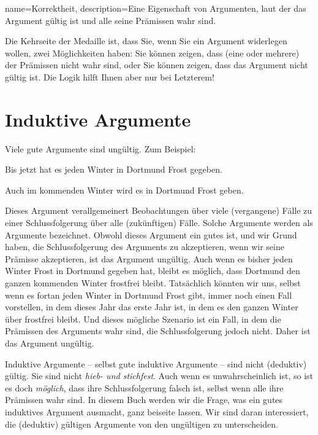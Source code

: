 {
name=Korrektheit,
description={Eine Eigenschaft von Argumenten, laut der das Argument gültig ist und alle seine Prämissen wahr sind.}
}

Die Kehrseite der Medaille ist, dass Sie, wenn Sie ein Argument widerlegen wollen, zwei Möglichkeiten haben: Sie können zeigen, dass (eine oder mehrere) der Prämissen nicht wahr sind, oder Sie können zeigen, dass das Argument nicht gültig ist. Die Logik hilft Ihnen aber nur bei Letzterem!  

\section{Induktive Argumente}

Viele gute Argumente sind ungültig. Zum Beispiel:
	\begin{earg}
		\item[] Bis jetzt hat es jeden Winter in Dortmund Frost gegeben.
	\item[\therefore] Auch im kommenden Winter wird es in Dortmund Frost geben.
\end{earg}
Dieses Argument verallgemeinert Beobachtungen über viele (vergangene) Fälle zu einer Schlussfolgerung über alle (zukünftigen) Fälle. Solche Argumente werden als  Argumente bezeichnet. Obwohl dieses Argument ein gutes ist, und wir Grund haben, die Schlussfolgerung des Arguments zu akzeptieren, wenn wir seine Prämisse akzeptieren, ist das Argument ungültig. Auch wenn es bisher jeden Winter Frost in Dortmund gegeben hat, bleibt es möglich, dass Dortmund den ganzen kommenden Winter frostfrei bleibt. Tatsächlich könnten wir uns, selbst wenn es fortan jeden Winter in Dortmund Frost gibt, immer noch einen Fall vorstellen, in dem dieses Jahr das erste Jahr ist, in dem es den ganzen Winter über frostfrei bleibt. Und dieses mögliche Szenario ist ein Fall, in dem die Prämissen des Arguments wahr sind, die Schlussfolgerung jedoch nicht. Daher ist das Argument ungültig.

Induktive Argumente -- selbst gute induktive Argumente -- sind nicht (deduktiv) gültig. Sie sind nicht \emph{hieb- und stichfest}. Auch wenn es unwahrscheinlich ist, so ist es doch \emph{möglich}, dass ihre Schlussfolgerung falsch ist, selbst wenn alle ihre Prämissen wahr sind. In diesem Buch werden wir die Frage, was ein gutes induktives Argument ausmacht, ganz beiseite lassen. Wir sind daran interessiert, die (deduktiv) gültigen Argumente von den ungültigen zu unterscheiden.  

